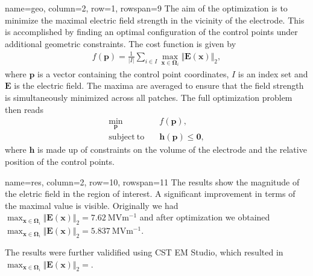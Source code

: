 \documentclass[
   accentcolor=9b,
   boxstyle=boxed
   ]{tudasciposter}
\begin{document}
\begin{tcbposter}[poster={columns=2, rows=20, spacing=1cm}]
\begin{posterboxenv}[title=Shape Optimization]{name=geo, column=2, row=1, rowspan=9}
   The aim of the optimization is to minimize the maximal electric field strength in the vicinity of the electrode. This is accomplished by finding an optimal configuration of the control points under additional geometric constraints.
   The cost function is given by
   \begin{align*}
      f(\mathbf{p}) = \frac{1}{|I|} \sum_{i \in I} \max_{\mathbf{x} \in \boldsymbol{\Omega}_i} \Vert \mathbf{E}(\mathbf{x}) \Vert_2,
   \end{align*}
   where $\mathbf{p}$ is a vector containing the control point coordinates, $I$ is an index set and $\mathbf{E}$ is the electric field. The maxima are averaged to ensure that the field strength is simultaneously minimized across all patches.
   The full optimization problem then reads
   \begin{align*}
      \min_\mathbf{p}& \quad f(\mathbf{p}),\\
      \mathrm{subject\ to}& \quad \mathbf{h}(\mathbf{p}) \leq \mathbf{0},
   \end{align*}
   where $\mathbf{h}$ is made up of constraints on the volume of the electrode and the relative position of the control points.

   \begin{center}
      
   \end{center}
\end{posterboxenv}


\begin{posterboxenv}[title=Results]{name=res, column=2, row=10, rowspan=11}
   The results show the magnitude of the eletric field in the region of interest. A significant improvement in terms of the maximal value is visible.
   Originally we had $\max_{\mathbf{x} \in \boldsymbol{\Omega}_i} \Vert \mathbf{E}(\mathbf{x}) \Vert_2 = \mathbf{7.62}\ \mathrm{MVm^{-1}}$ and after optimization we obtained $\max_{\mathbf{x} \in \boldsymbol{\Omega}_i} \Vert \mathbf{E}(\mathbf{x}) \Vert_2 = \mathbf{5.837}\ \mathrm{MVm^{-1}}$.\\

   \begin{center}
      

      
   \end{center}

   The results were further validified using CST EM Studio, which resulted in $\max_{\mathbf{x} \in \boldsymbol{\Omega}_i} \Vert \mathbf{E}(\mathbf{x}) \Vert_2 = $.

   \begin{center}
      
   \end{center}
\end{posterboxenv}

\end{tcbposter}
\end{document}
